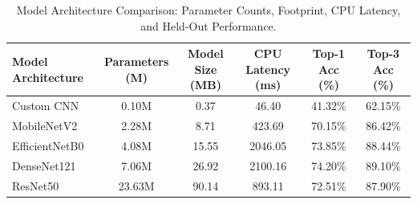 \begin{table}[htbp]
\centering
\caption{Model Architecture Comparison: Parameter Counts, Footprint, CPU Latency, and Held-Out Performance.}
\label{tbl:model_comparison}
\small
\begin{tabular}{lccccc}
\toprule
Model Architecture & Parameters (M) & Model Size (MB) & CPU Latency (ms) & Top-1 Acc (\%) & Top-3 Acc (\%) \\
\midrule
Custom CNN & 0.10M & 0.37 & 46.40 & 41.32\% & 62.15\% \\
MobileNetV2 & 2.28M & 8.71 & 423.69 & 70.15\% & 86.42\% \\
EfficientNetB0 & 4.08M & 15.55 & 2046.05 & 73.85\% & 88.44\% \\
DenseNet121 & 7.06M & 26.92 & 2100.16 & 74.20\% & 89.10\% \\
ResNet50 & 23.63M & 90.14 & 893.11 & 72.51\% & 87.90\% \\
\bottomrule
\end{tabular}
\end{table}
